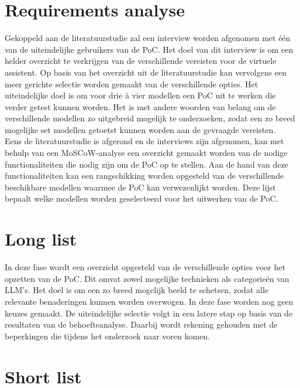 \section{Requirements analyse}

Gekoppeld aan de literatuurstudie zal een interview worden afgenomen met één van de uiteindelijke gebruikers van de PoC. Het doel van dit interview is om een helder overzicht te verkrijgen van de verschillende vereisten voor de virtuele assistent. Op basis van het overzicht uit de literatuurstudie kan vervolgens een meer gerichte selectie worden gemaakt van de verschillende opties. Het uiteindelijke doel is om voor drie à vier modellen een PoC uit te werken die verder getest kunnen worden. Het is met andere woorden van belang om de verschillende modellen zo uitgebreid mogelijk te onderzoeken, zodat een zo breed mogelijke set modellen getoetst kunnen worden aan de gevraagde vereisten. 
\\[1em]
Eens de literatuurstudie is afgerond en de interviews zijn afgenomen, kan met behulp van een MoSCoW-analyse een overzicht gemaakt worden van de nodige functionaliteiten die nodig zijn om de PoC op te stellen. Aan de hand van deze functionaliteiten kan een rangschikking worden opgesteld van de verschillende beschikbare modellen waarmee de PoC kan verwezenlijkt worden. Deze lijst bepaalt welke modellen worden geselecteerd voor het uitwerken van de PoC.

\section{Long list}

In deze fase wordt een overzicht opgesteld van de verschillende opties voor het opzetten van de PoC. Dit omvat zowel mogelijke technieken als categorieën van LLM’s. Het doel is om een zo breed mogelijk beeld te schetsen, zodat alle relevante benaderingen kunnen worden overwogen. In deze fase worden nog geen keuzes gemaakt. De uiteindelijke selectie volgt in een latere stap op basis van de resultaten van de behoefteanalyse. Daarbij wordt rekening gehouden met de beperkingen die tijdens het onderzoek naar voren komen.

\section{Short list}

